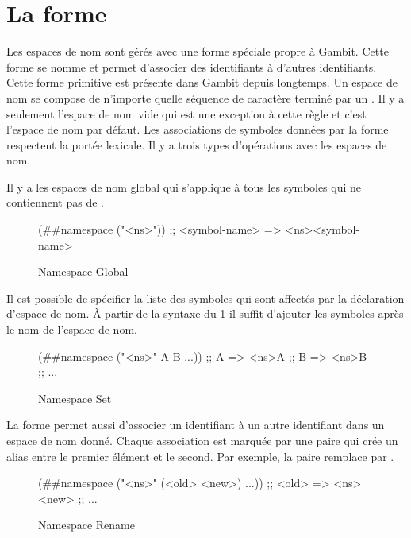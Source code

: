 \section{La forme }

Les espaces de nom sont gérés avec une forme spéciale propre à Gambit. Cette
forme se nomme  et permet d'associer des identifiants à
d'autres identifiants.  Cette forme primitive est présente dans Gambit depuis longtemps.  Un
espace de nom se compose de n'importe quelle séquence de caractère terminé par
un \lstcode{#}. Il y a seulement l'espace de nom vide qui est une exception à cette
règle et c'est l'espace de nom par défaut.  Les associations de symboles données
par la forme  respectent la portée lexicale. Il y a trois
types d'opérations avec les espaces de nom.

Il y a les espaces de nom global qui s'applique à tous les symboles qui ne
contiennent pas de \lstcode{#}. \\
\begin{figure}[ht]
  \centering
  \begin{mplisting}{0.6}
(##namespace ("<ns>"))
;; <symbol-name> => <ns><symbol-name>
\end{mplisting}
  \caption{Namespace Global}
  \label{fig:forms->namespace-global}
\end{figure}

Il est possible de spécifier la liste des symboles qui sont affectés par la
déclaration d'espace de nom. À partir de la syntaxe du
\ref{fig:forms->namespace-global} il suffit d'ajouter les symboles après le nom
de l'espace de nom.\\
\begin{figure}[ht]
  \centering
  \begin{mplisting}{0.6}
(##namespace ("<ns>" A B ...))
;; A => <ns>A
;; B => <ns>B
;; ...
\end{mplisting}
  \caption{Namespace Set}
  \label{fig:forms->namespace-set}
\end{figure}

La forme  permet aussi d'associer un identifiant à un
autre identifiant dans un espace de nom donné. Chaque association est marquée
par une paire qui crée un alias entre le premier élément et le second. Par exemple,
la paire  remplace  par .\\
\begin{figure}[ht]
  \centering
  \begin{mplisting}{0.6}
(##namespace ("<ns>" (<old> <new>) ...))
;; <old> => <ns><new>
;; ...
\end{mplisting}
  \caption{Namespace Rename}
  \label{fig:forms->namespace-rename}
\end{figure}

